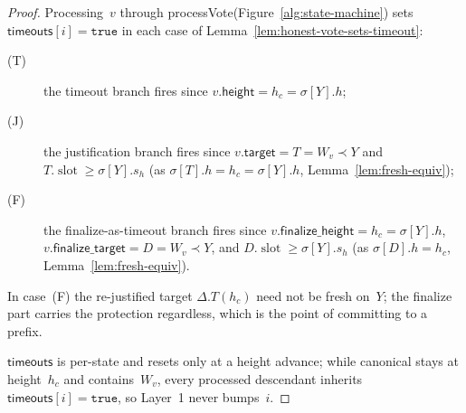\ifx\litemode\undefined\documentclass{article}\fi
\newcommand{\slot}[0]{\ensuremath{\operatorname{\mathrm{slot}}}}
\newcommand{\target}{\mathsf{target}}
\newcommand{\height}{\mathsf{height}}
\newcommand{\finalizeHeight}{\mathsf{finalize\_height}}
\newcommand{\finalizeTarget}{\mathsf{finalize\_target}}
\newcommand{\timeouts}{\mathsf{timeouts}}
\newcommand{\processVote}{\textsf{processVote}\xspace}
\theoremstyle{plain}
\theoremstyle{definition}
\theoremstyle{remark}
\begin{document}
\begin{proof}
Processing~$v$ through \processVote (Figure~\ref{alg:state-machine}) sets $\timeouts[i] = \mathtt{true}$ in each case of Lemma~\ref{lem:honest-vote-sets-timeout}:
\begin{description}
\item[\textnormal{(T)}] the timeout branch fires since $v.\height = h_c = \sigma[Y].h$;
\item[\textnormal{(J)}] the justification branch fires since $v.\target = T = W_v \prec Y$ and $T.\slot \geq \sigma[Y].s_h$ (as $\sigma[T].h = h_c = \sigma[Y].h$, Lemma~\ref{lem:fresh-equiv});
\item[\textnormal{(F)}] the finalize-as-timeout branch fires since $v.\finalizeHeight = h_c = \sigma[Y].h$, $v.\finalizeTarget = D = W_v \prec Y$, and $D.\slot \geq \sigma[Y].s_h$ (as $\sigma[D].h = h_c$, Lemma~\ref{lem:fresh-equiv}).
\end{description}
In case~(F) the re-justified target $\Delta.T(h_c)$ need not be fresh on~$Y$; the finalize part carries the protection regardless, which is the point of committing to a prefix.

$\timeouts$ is per-state and resets only at a height advance; while canonical stays at height~$h_c$ and contains~$W_v$, every processed descendant inherits $\timeouts[i] = \mathtt{true}$, so Layer~1 never bumps~$i$.
\end{proof}
\end{document}
